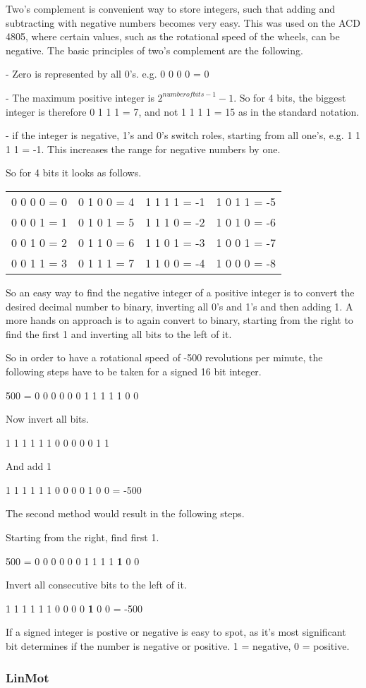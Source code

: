 Two's complement is convenient way to store integers, such that adding and subtracting with negative numbers becomes very easy. This was used on the ACD 4805, where certain values, such as the rotational speed of the wheels, can be negative. 
The basic principles of two's complement are the following.

- Zero is represented by all 0's. 
e.g. 0 0 0 0 = 0

- The maximum positive integer is $ 2^{number of bits-1}-1 $.
So for 4 bits, the biggest integer is therefore 0 1 1 1 = 7, and not 1 1 1 1 = 15 as in the standard notation.

- if the integer is negative, 1's and 0's switch roles, starting from all one's, e.g. 1 1 1 1 = -1. This increases the range for negative numbers by one.

So for 4 bits it looks as follows.

\begin{tabular}{llll}
0 0 0 0 = 0 & 0 1 0 0 = 4 & 1 1 1 1 = -1 & 1 0 1 1 = -5\\
0 0 0 1 = 1 & 0 1 0 1 = 5 & 1 1 1 0 = -2 & 1 0 1 0 = -6\\
0 0 1 0 = 2 & 0 1 1 0 = 6 & 1 1 0 1 = -3 & 1 0 0 1 = -7\\
0 0 1 1 = 3 & 0 1 1 1 = 7 & 1 1 0 0 = -4 & 1 0 0 0 = -8
\end{tabular}

So an easy way to find the negative integer of a positive integer is to convert the desired decimal number to binary, inverting all 0's and 1's and then adding 1. A more hands on approach is to again convert to binary, starting from the right to find the first 1 and inverting all bits to the left of it.

So in order to have a rotational speed of -500 revolutions per minute, the following steps have to be taken for a signed 16 bit integer.

500 = 0 0 0 0  0 0 1  1 1 1  1 0 0

Now invert all bits.

1 1 1 1  1 1 0  0 0 0  0 1 1

And add 1

1 1 1 1  1 1 0  0 0 0  1 0 0 = -500

The second method would result in the following steps.

Starting from the right, find first 1.

500 = 0 0 0 0  0 0 1  1 1 1  \textbf{1} 0 0

Invert all consecutive bits to the left of it.

1 1 1 1  1 1 0  0 0 0  \textbf{1} 0 0 = -500

If a signed integer is postive or negative is easy to spot, as it's most significant bit determines if the number is negative or positive. 1 = negative, 0 = positive.

\subsubsection{LinMot}

